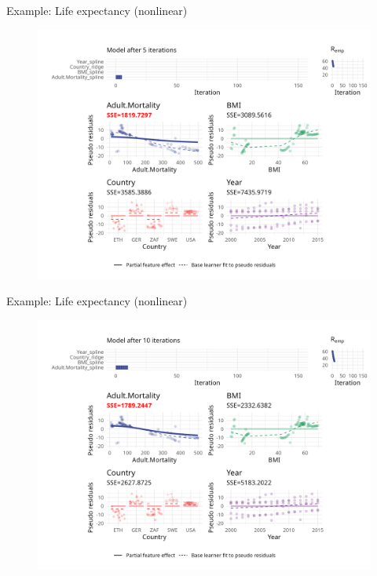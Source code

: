 \begin{frame}{Example: Life expectancy (nonlinear)}
	\begin{figure}
		\centering
		\includegraphics[width=\textwidth]{figures/cwb-anim/fig-iter-0005.png}
	\end{figure}
	\addtocounter{framenumber}{-1}
\end{frame}


\begin{frame}{Example: Life expectancy (nonlinear)}
	\begin{figure}
		\centering
		\includegraphics[width=\textwidth]{figures/cwb-anim/fig-iter-0010.png}
	\end{figure}
	\addtocounter{framenumber}{-1}
\end{frame}


